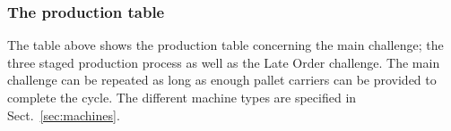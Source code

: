 \documentclass[12pt,twoside]{article}
\begin{document}






\subsubsection{The production table}

The table above shows the production table concerning the main
challenge; the three staged production process as well as the Late Order challenge. The main challenge can be repeated as long as enough
pallet carriers can be provided to complete the cycle. The different
machine types are specified in Sect.~\ref{sec:machines}.
\end{document}
